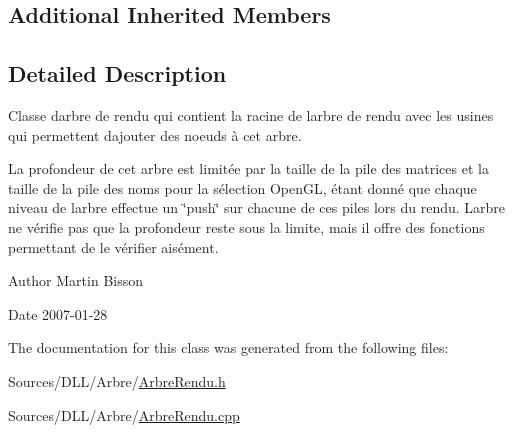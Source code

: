 \subsection*{Additional Inherited Members}


\subsection{Detailed Description}
Classe d\textquotesingle{}arbre de rendu qui contient la racine de l\textquotesingle{}arbre de rendu avec les usines qui permettent d\textquotesingle{}ajouter des noeuds à cet arbre. 

La profondeur de cet arbre est limitée par la taille de la pile des matrices et la taille de la pile des noms pour la sélection Open\+G\+L, étant donné que chaque niveau de l\textquotesingle{}arbre effectue un \char`\"{}push\char`\"{} sur chacune de ces piles lors du rendu. L\textquotesingle{}arbre ne vérifie pas que la profondeur reste sous la limite, mais il offre des fonctions permettant de le vérifier aisément.

\begin{DoxyAuthor}{Author}
Martin Bisson 
\end{DoxyAuthor}
\begin{DoxyDate}{Date}
2007-\/01-\/28 
\end{DoxyDate}


The documentation for this class was generated from the following files\+:\begin{DoxyCompactItemize}
\item 
Sources/\+D\+L\+L/\+Arbre/\hyperlink{_arbre_rendu_8h}{Arbre\+Rendu.\+h}\item 
Sources/\+D\+L\+L/\+Arbre/\hyperlink{_arbre_rendu_8cpp}{Arbre\+Rendu.\+cpp}\end{DoxyCompactItemize}
